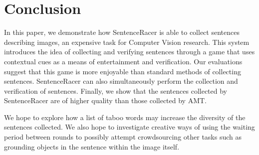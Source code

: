 \documentclass[preprint]{sigchi}
\begin{document}
\section{Conclusion}
In this paper, we demonstrate how SentenceRacer is able to collect sentences describing images, an expensive task for Computer Vision research. This system introduces the idea of collecting and verifying sentences through a game that uses contextual cues as a means of entertainment and verification. Our evaluations suggest that this game is more enjoyable than standard methods of collecting sentences. SentenceRacer can also simultaneously perform the collection and verification of sentences. Finally, we show that the sentences collected by SentenceRacer are of higher quality than those collected by AMT. 

We hope to explore how a list of taboo words may increase the diversity of the sentences collected. We also hope to investigate creative ways of using the waiting period between rounds to possibly attempt crowdsourcing other tasks such as grounding objects in the sentence within the image itself.


\balance





\end{document}
